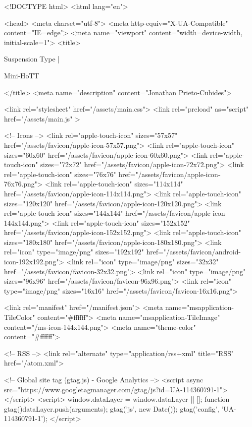 <!DOCTYPE html>
<html lang="en">

<head>
  <meta charset="utf-8">
  <meta http-equiv="X-UA-Compatible" content="IE=edge">
  <meta name="viewport" content="width=device-width, initial-scale=1">
  <title>
    
      
        Suspension Type |
      
        Mini-HoTT
    
  </title>
  <meta name="description" content="Jonathan Prieto-Cubides">

  <link rel="stylesheet" href="/assets/main.css">
  <link rel="preload" as="script" href="/assets/main.js" >

  <!-- Icons -->
  <link rel="apple-touch-icon" sizes="57x57" href="/assets/favicon/apple-icon-57x57.png">
  <link rel="apple-touch-icon" sizes="60x60" href="/assets/favicon/apple-icon-60x60.png">
  <link rel="apple-touch-icon" sizes="72x72" href="/assets/favicon/apple-icon-72x72.png">
  <link rel="apple-touch-icon" sizes="76x76" href="/assets/favicon/apple-icon-76x76.png">
  <link rel="apple-touch-icon" sizes="114x114" href="/assets/favicon/apple-icon-114x114.png">
  <link rel="apple-touch-icon" sizes="120x120" href="/assets/favicon/apple-icon-120x120.png">
  <link rel="apple-touch-icon" sizes="144x144" href="/assets/favicon/apple-icon-144x144.png">
  <link rel="apple-touch-icon" sizes="152x152" href="/assets/favicon/apple-icon-152x152.png">
  <link rel="apple-touch-icon" sizes="180x180" href="/assets/favicon/apple-icon-180x180.png">
  <link rel="icon" type="image/png" sizes="192x192"  href="/assets/favicon/android-icon-192x192.png">
  <link rel="icon" type="image/png" sizes="32x32" href="/assets/favicon/favicon-32x32.png">
  <link rel="icon" type="image/png" sizes="96x96" href="/assets/favicon/favicon-96x96.png">
  <link rel="icon" type="image/png" sizes="16x16" href="/assets/favicon/favicon-16x16.png">

  <link rel="manifest" href="/manifest.json">
  <meta name="msapplication-TileColor" content="#ffffff">
  <meta name="msapplication-TileImage" content="/ms-icon-144x144.png">
  <meta name="theme-color" content="#ffffff">

  <!-- RSS -->
  <link rel="alternate" type="application/rss+xml" title="RSS" href="/atom.xml">

  <!-- Global site tag (gtag.js) - Google Analytics -->
  <script async src="https://www.googletagmanager.com/gtag/js?id=UA-114360791-1"></script>
  <script>
    window.dataLayer = window.dataLayer || [];
    function gtag(){dataLayer.push(arguments);}
    gtag('js', new Date());
    gtag('config', 'UA-114360791-1');
  </script>

